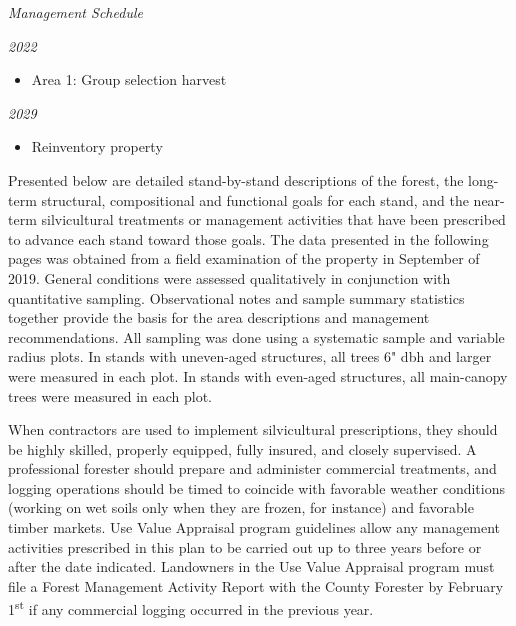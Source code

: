 \documentclass[]{tufte-handout}
\begin{document}
\begin{marginfigure}
\noindent \textit{\LARGE Management Schedule}
\vspace{10pt}

\noindent \textit{\large 2022}

\begin{itemize}
  \item Area 1: Group selection harvest  
\end{itemize}

\vspace{10pt}  
\noindent \textit{\large 2029}  

\begin{itemize}
  \item Reinventory property
\end{itemize}
\end{marginfigure}

Presented below are detailed stand-by-stand descriptions of the forest,
the long-term structural, compositional and functional goals for each
stand, and the near-term silvicultural treatments or management
activities that have been prescribed to advance each stand toward those
goals. The data presented in the following pages was obtained from a
field examination of the property in September of 2019. General
conditions were assessed qualitatively in conjunction with quantitative
sampling. Observational notes and sample summary statistics together
provide the basis for the area descriptions and management
recommendations. All sampling was done using a systematic sample and
variable radius plots. In stands with uneven-aged structures, all trees
6" dbh and larger were measured in each plot. In stands with even-aged
structures, all main-canopy trees were measured in each plot.

When contractors are used to implement silvicultural prescriptions, they
should be highly skilled, properly equipped, fully insured, and closely
supervised. A professional forester should prepare and administer
commercial treatments, and logging operations should be timed to
coincide with favorable weather conditions (working on wet soils only
when they are frozen, for instance) and favorable timber markets. Use
Value Appraisal program guidelines allow any management activities
prescribed in this plan to be carried out up to three years before or
after the date indicated. Landowners in the Use Value Appraisal program
must file a Forest Management Activity Report with the County Forester
by February 1\textsuperscript{st} if any commercial logging occurred in
the previous year.
\end{document}
